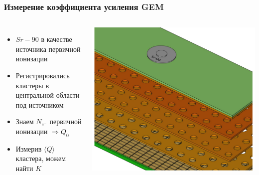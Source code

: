\documentclass[14pt]{beamer}
\begin{document}
\begin{frame}[t]
\frametitle{Измерение коэффициента усиления GEM}
\vspace{0pt}
\begin{columns}
\begin{minipage}[t][1\textheight]{\linewidth}
\small{\begin{itemize}
		\item $Sr-90$ в качестве источника первичной ионизации
		\item Регистрировались кластеры в центральной области под источником
		\item Знаем  $N_{e^-}$ первичной ионизации $\Rightarrow Q_{0}$ 
		\item Измерив $\langle Q\rangle$ кластера, можем найти $K$
\end{itemize}}
\end{minipage}%
\begin{minipage}[t][1\textheight]{\linewidth}
\vspace*{20pt}
\center \includegraphics[width=0.9\linewidth]{GEM_Sr_source.pdf}

\end{minipage}%
\end{columns}
\end{frame}
\end{document}
